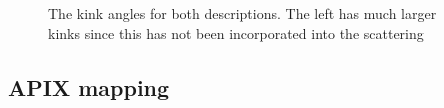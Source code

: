 \begin{figure}[H]
\hspace{-35mm}
\caption{The kink angles for both descriptions. The left has much larger kinks since this has not been incorporated into the scattering}
\label{fig:kinkRad}
\end{figure}

\subsection{APIX mapping}

